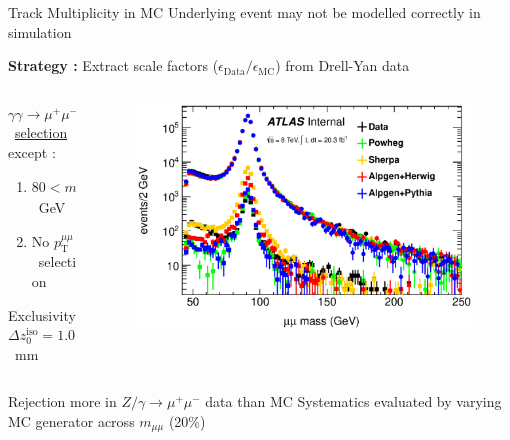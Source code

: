 \documentclass[10pt]{beamer}
\newcommand*{\yymumu}{\ensuremath{\gamma\gamma \to \mu^+\mu^-}}
\newcommand*{\mmumu}{\ensuremath{m_{\mu\mu}}}
\newcommand*{\pTmumu}{\ensuremath{p_{\textrm{T}}^{\mu\mu}}}
\newcommand*{\memu}{\ensuremath{m_{e\mu}}}
\newcommand*{\DZ}{\ensuremath{\Delta z_0^{\mathrm{iso}}}}
\begin{document}
\begin{frame}{Track Multiplicity in MC}
\centering
{\large\color{blue} Underlying event may not be modelled correctly in simulation} 
\begin{outline}
\1 {\bf Strategy : }  Extract scale factors ($\epsilon_{\textrm{Data}}/\epsilon_{\textrm{MC}}$) from Drell-Yan data 
\end{outline}
\begin{columns}
	\begin{column}{0.4\linewidth}
\begin{tcolorbox}[title=Selection, width=\linewidth, colback=white,colframe=red!50!white,nobeforeafter,tcbox raise base,top=0pt,left=0pt,right=0pt,bottom=0pt]
\yymumu\ \hyperlink{mumu}{selection} except :
\begin{enumerate}
\item $80 < m_{\mu\mu} < 100$~GeV 
\item No \pTmumu\ selection
\end{enumerate}
Exclusivity $\DZ = 1.0$~mm 
\end{tcolorbox}
	\end{column}
	\begin{column}{0.6\linewidth}
\begin{figure}
\includegraphics[width=\linewidth]{figures/zrejcal.eps}
\end{figure}
	\end{column}
\end{columns}

\begin{outline}
\1 Rejection more in $Z/\gamma\to\mu^+\mu^-$ data than MC
\1 Systematics evaluated by varying MC generator across $\mmumu$ (20\%)
\end{outline}
\end{frame}
\end{document}
